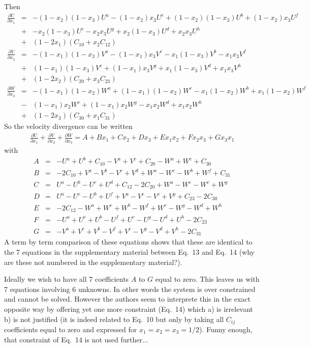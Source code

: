 Then 
\begin{eqnarray}
\frac{\partial U}{\partial x_1}  
&=&-(1-x_2)(1-x_3) U^a 
-(1-x_2)x_3 U^e 
+(1-x_2)(1-x_3) U^b
+(1-x_2)x_3 U^f \nonumber\\
&+&-x_2(1-x_3) U^c 
-x_2 x_3 U^g 
+ x_2(1-x_3) U^d 
+  x_2 x_3 U^h \nonumber\\
&+& (1-2x_1)(C_{10}+x_2 C_{12})
\\
\frac{\partial V}{\partial x_2}
&=&-(1-x_1)(1-x_3) V^a 
-(1-x_1)x_3 V^e 
-x_1(1-x_3) V^b
-x_1x_3 V^f \nonumber\\
&+&(1-x_1)(1-x_3) V^c
+(1-x_1) x_3 V^g 
+x_1 (1-x_3) V^d 
+x_1  x_3 V^h \nonumber\\
&+& (1-2x_2)(C_{20}+x_3 C_{23})
\\
\frac{\partial W}{\partial x_3} 
&=&-(1-x_1)(1-x_2) W^a 
+(1-x_1)(1-x_2) W^e 
-x_1(1-x_2) W^b
+x_1(1-x_2) W^f \nonumber\\
&-&(1-x_1)x_2 W^c 
+(1-x_1)x_2  W^g 
-x_1 x_2 W^d 
+ x_1 x_2  W^h \nonumber\\
&+& (1-2x_3)(C_{30}+x_1 C_{31})
\end{eqnarray}
So the velocity divergence can be written 
\begin{eqnarray}
\frac{\partial U}{\partial x_1}
+
\frac{\partial V}{\partial x_2} 
+
\frac{\partial W}{\partial x_3} 
= A + Bx_1 + Cx_2 + Dx_3 + E x_1x_2 + Fx_2x_3 + G x_3x_1
\end{eqnarray}
with
\begin{eqnarray}
A &=& -U^a + U^b  + C_{10} -V^a + V^c + C_{20} -W^a + W^e + C_{30}
\\
B &=& -2 C_{10} + V^a -V^b -V^c +V^d  + W^a -W^e -W^b +W^f +C_{31}
\\
C &=& U^a -U^b -U^c +U^d + C_{12} -2 C_{20} +W^a -W^e -W^c +W^g
\\
D &=& U^a -U^e -U^b +U^f + V^a -V^e -V^c +V^g + C_{23} -2C_{30}
\\
E &=& -2C_{12}  -W^a +W^e +W^b -W^f + W^c -W^g -W^d +W^h
\\
F &=& -U^a +U^e +U^b -U^f +U^c -U^g -U^d +U^h   -2C_{23}
\\
G &=&   -V^a +V^e +V^b -V^f +V^c -V^g -V^d + V^h -2C_{31}
\end{eqnarray}
A term by term comparison of these equations shows that these are identical to the 
7 equations in the supplementary material between Eq.~13 and Eq.~14 (why are these not 
numbered in the supplementary material?).

Ideally we wish to have all 7 coefficients $A$ to $G$ equal to zero. 
This leaves us with 7 equations involving 6 unknowns.
In other words the system is over constrained and cannot be solved. 
However the authors seem to interprete this in the exact opposite way by offering 
yet one more constraint (Eq.~14) which a) is irrelevant b) is not justified (it is 
indeed related to Eq.~10 but only by taking all $C_{ij}$ coefficients equal to zero and expressed 
for $x_1=x_2=x_3=1/2$). Funny enough, that constraint of Eq.~14 is not used further... 

